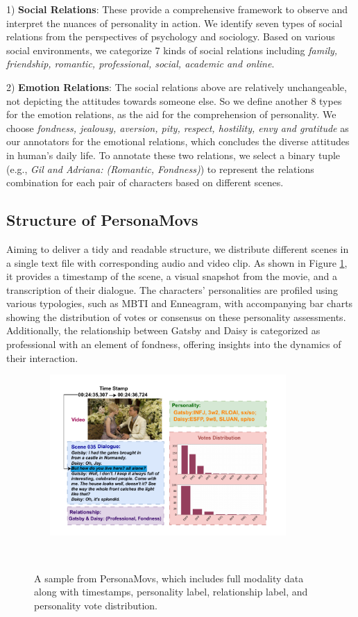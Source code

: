 1) \textbf{Social Relations}: These provide a comprehensive framework to observe and interpret the nuances of personality in action. We identify seven types of social relations from the perspectives of psychology and sociology. Based on various social environments, we categorize 7 kinds of social relations including \textit{family, friendship, romantic, professional, social, academic and online}.

2) \textbf{Emotion Relations}: The social relations above are relatively unchangeable, not depicting the attitudes towards someone else. So we define another 8 types for the emotion relations, as the aid for the comprehension of personality. We choose \textit{fondness, jealousy, aversion, pity, respect, hostility, envy and gratitude} as our annotators for the emotional relations, which concludes the diverse attitudes in human's daily life. To annotate these two relations, we select a binary tuple (e.g., \textit{Gil and Adriana: (Romantic, Fondness)}) to represent the relations combination for each pair of characters based on different scenes.

\subsection{Structure of PersonaMovs}
Aiming to deliver a tidy and readable structure, we distribute different scenes in a single text file with corresponding audio and video clip. As shown in Figure \ref{fig:sample}, it provides a timestamp of the scene, a visual snapshot from the movie, and a transcription of their dialogue. The characters' personalities are profiled using various typologies, such as MBTI and Enneagram, with accompanying bar charts showing the distribution of votes or consensus on these personality assessments. Additionally, the relationship between Gatsby and Daisy is categorized as professional with an element of fondness, offering insights into the dynamics of their interaction.

\begin{figure}[th!]
  \centering
  \includegraphics[width=0.8\textwidth, trim=0 15 0 0, clip]{images/Sample.pdf}
  \caption{A sample from PersonaMovs, which includes full modality data along with timestamps, personality label, relationship label, and personality vote distribution.}
  \label{fig:sample}
\end{figure}


